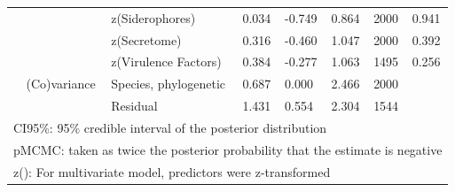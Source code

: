 \begin{table}
\begin{tabular}[t]{llllllll}
\hspace{1em} &  & z(Siderophores) & 0.034 & -0.749 & 0.864 & 2000 & 0.941\\
\hspace{1em} &  & z(Secretome) & 0.316 & -0.460 & 1.047 & 2000 & 0.392\\
\hspace{1em} &  & z(Virulence Factors) & 0.384 & -0.277 & 1.063 & 1495 & 0.256\\
\hspace{1em} & (Co)variance & Species, phylogenetic & 0.687 & 0.000 & 2.466 & 2000 & \\
\hspace{1em} &  & Residual & 1.431 & 0.554 & 2.304 & 1544 & \\
\bottomrule
\multicolumn{8}{l}{\rule{0pt}{1em}CI95\%: 95\% credible interval of the posterior distribution}\\
\multicolumn{8}{l}{\rule{0pt}{1em}pMCMC: taken as twice the posterior probability that the estimate is negative}\\
\multicolumn{8}{l}{\rule{0pt}{1em}z(): For multivariate model, predictors were z-transformed}\\
\end{tabular}
\end{table}
